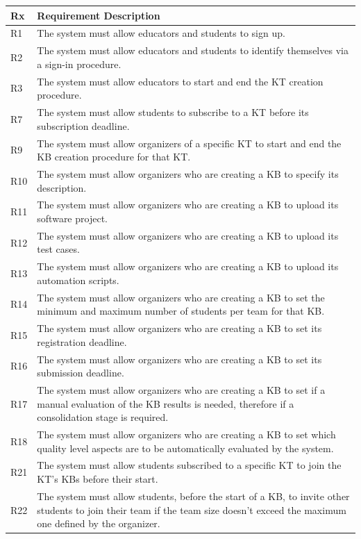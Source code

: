 \documentclass[11pt]{report}
\begin{document}
\begin{longtable}[h] {|p{10mm} p{130mm}|}
\hline
\textbf{Rx} & \textbf{Requirement Description} \\ \hline
R1 & The system must allow educators and students to sign up. \\ 
R2 & The system must allow educators and students to identify themselves via a sign-in procedure. \\ 
R3 & The system must allow educators to start and end the KT creation procedure.\\
R7 & The system must allow students to subscribe to a KT before its subscription deadline. \\ 
R9 & The system must allow organizers of a specific KT to start and end the KB creation procedure for that KT\@. \\
R10 & The system must allow organizers who are creating a KB to specify its description. \\ 
R11 & The system must allow organizers who are creating a KB to upload its software project. \\ 
R12 & The system must allow organizers who are creating a KB to upload its test cases. \\ 
R13 & The system must allow organizers who are creating a KB to upload its automation scripts. \\ 
R14 & The system must allow organizers who are creating a KB to set the minimum and maximum number of students per team for that KB. \\ 
R15 & The system must allow organizers who are creating a KB to set its registration deadline. \\ 
R16 & The system must allow organizers who are creating a KB to set its submission deadline. \\ 
R17 & The system must allow organizers who are creating a KB to set if a manual evaluation of the KB results is needed, therefore if a consolidation stage is required. \\ 
R18 & The system must allow organizers who are creating a KB to set which quality level aspects are to be automatically evaluated by the system. \\ 
R21 & The system must allow students subscribed to a specific KT to join the KT’s KBs before their start. \\ 
R22 & The system must allow students, before the start of a KB, to invite other students to join their team if the team size doesn't exceed the maximum one defined by the organizer. \\

\end{longtable}
\end{document}
